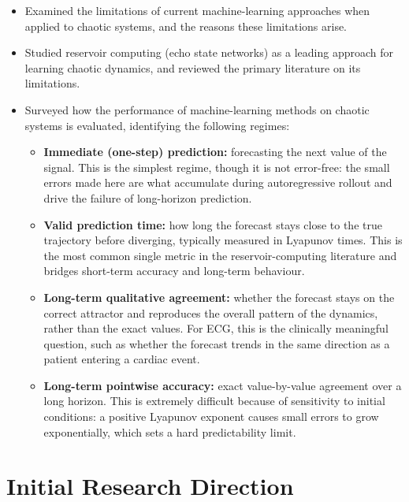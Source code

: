 \documentclass[11pt,a4paper]{article}
\begin{document}
\begin{itemize}
  \item Examined the limitations of current machine-learning approaches when
        applied to chaotic systems, and the reasons these limitations arise.
  \item Studied reservoir computing (echo state networks) as a leading
        approach for learning chaotic dynamics, and reviewed the primary
        literature on its limitations.
  \item Surveyed how the performance of machine-learning methods on chaotic
        systems is evaluated, identifying the following regimes:
        \begin{itemize}
          \item \textbf{Immediate (one-step) prediction:} forecasting the next
                value of the signal. This is the simplest regime, though it is
                not error-free: the small errors made here are what accumulate
                during autoregressive rollout and drive the failure of
                long-horizon prediction.
          \item \textbf{Valid prediction time:} how long the forecast stays
                close to the true trajectory before diverging, typically
                measured in Lyapunov times. This is the most common single
                metric in the reservoir-computing literature and bridges
                short-term accuracy and long-term behaviour.
          \item \textbf{Long-term qualitative agreement:} whether the forecast
                stays on the correct attractor and reproduces the overall
                pattern of the dynamics, rather than the exact values. For ECG,
                this is the clinically meaningful question, such as whether the
                forecast trends in the same direction as a patient entering a
                cardiac event.
          \item \textbf{Long-term pointwise accuracy:} exact value-by-value
                agreement over a long horizon. This is extremely difficult
                because of sensitivity to initial conditions: a positive
                Lyapunov exponent causes small errors to grow exponentially,
                which sets a hard predictability limit.
        \end{itemize}
\end{itemize}

\section{Initial Research Direction}
\end{document}
